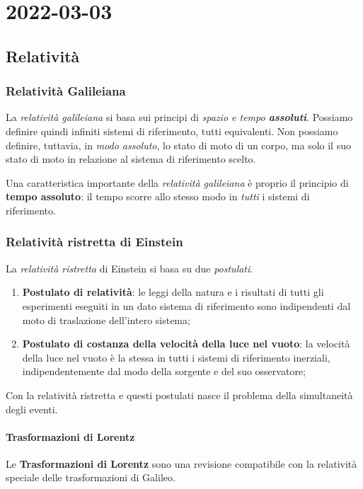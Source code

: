 \chapter{2022-03-03} %
\section{Relatività}
\subsection{Relatività Galileiana}
La \textit{relatività galileiana} si basa sui principi di \textit{spazio e
	tempo \textbf{assoluti}}. Possiamo definire quindi infiniti sistemi di
riferimento, tutti equivalenti. Non possiamo definire, tuttavia, in
\textit{modo assoluto}, lo stato di moto di un corpo, ma solo il suo stato di
moto in relazione al sistema di riferimento scelto.

Una caratteristica importante della \textit{relatività galileiana} è proprio il
principio di \textbf{tempo assoluto}: il tempo scorre allo stesso modo in
\textit{tutti} i sistemi di riferimento.

\subsection{Relatività ristretta di Einstein}
La \textit{relatività ristretta} di Einstein si basa su due \textit{postulati}.
\begin{enumerate}
	\item \textbf{Postulato di relatività}: le leggi della natura e i risultati
	      di tutti gli esperimenti eseguiti in un dato sistema di riferimento sono
	      indipendenti dal moto di traslazione dell'intero sistema;
	\item \textbf{Postulato di costanza della velocità della luce nel vuoto}: la
	      velocità della luce nel vuoto è la stessa in tutti i sistemi di riferimento
	      inerziali, indipendentemente dal modo della sorgente e del suo osservatore;
\end{enumerate}

\begin{note}[Simultaneità]
	Con la relatività ristretta e questi postulati nasce il problema della
	simultaneità degli eventi.
\end{note}

\subsubsection{Trasformazioni di Lorentz}
Le \textbf{Trasformazioni di Lorentz} sono una revisione compatibile con la
relatività speciale delle trasformazioni di Galileo.

